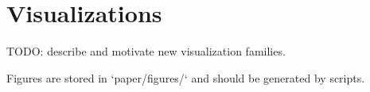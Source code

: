 \section{Visualizations}\label{sec:visualizations}

TODO: describe and motivate new visualization families.

Figures are stored in `paper/figures/` and should be generated by scripts.
